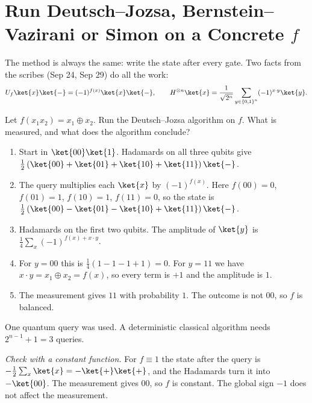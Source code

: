 \section{Run Deutsch--Jozsa, Bernstein--Vazirani or Simon on a Concrete $f$}\label{sec:run}

The method is always the same: write the state after every gate. Two facts from the scribes
(Sep 24, Sep 29) do all the work:
\[U_f \ket{x}\ket{-} = (-1)^{f(x)} \ket{x}\ket{-},
    \qquad
    H^{\otimes n}\ket{x} = \frac{1}{\sqrt{2^n}} \sum_{y \in \set{0,1}^n} (-1)^{x \cdot y} \ket{y}.\]

\begin{exercisebox}
\begin{pproblem}[Deutsch--Jozsa with $n = 2$]\label{pp:dj}
    Let $f(x_1 x_2) = x_1 \oplus x_2$. Run the Deutsch--Jozsa algorithm on $f$. What is measured,
    and what does the algorithm conclude?
\end{pproblem}
\tcblower
\begin{wsolution}
    \leavevmode
    \begin{enumerate}
        \item Start in $\ket{00}\ket{1}$. Hadamards on all three qubits give
              $\frac{1}{2}\left(\ket{00} + \ket{01} + \ket{10} + \ket{11}\right)\ket{-}$.
        \item The query multiplies each $\ket{x}$ by $(-1)^{f(x)}$. Here $f(00) = 0$, $f(01) = 1$,
              $f(10) = 1$, $f(11) = 0$, so the state is
              $\frac{1}{2}\left(\ket{00} - \ket{01} - \ket{10} + \ket{11}\right)\ket{-}$.
        \item Hadamards on the first two qubits. The amplitude of $\ket{y}$ is
              $\frac{1}{4} \sum_{x} (-1)^{f(x) + x \cdot y}$.
        \item For $y = 00$ this is $\frac{1}{4}(1 - 1 - 1 + 1) = 0$. For $y = 11$ we have
              $x \cdot y = x_1 \oplus x_2 = f(x)$, so every term is $+1$ and the amplitude is $1$.
        \item The measurement gives $11$ with probability $1$. The outcome is not $00$, so $f$ is
              balanced.
    \end{enumerate}
    One quantum query was used. A deterministic classical algorithm needs $2^{n-1} + 1 = 3$ queries.

    \emph{Check with a constant function.} For $f \equiv 1$ the state after the query is
    $-\frac{1}{2} \sum_{x} \ket{x} = -\ket{+}\ket{+}$, and the Hadamards turn it into $-\ket{00}$.
    The measurement gives $00$, so $f$ is constant. The global sign $-1$ does not affect the
    measurement.
\end{wsolution}
\end{exercisebox}


